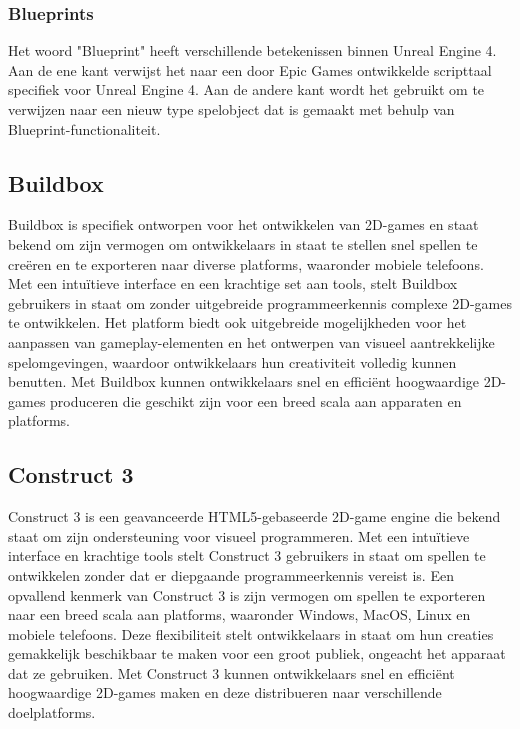 \subsubsection{Blueprints}
Het woord "Blueprint" heeft verschillende betekenissen binnen Unreal Engine 4. Aan de ene kant verwijst het naar een door Epic Games ontwikkelde scripttaal specifiek voor Unreal Engine 4. Aan de andere kant wordt het gebruikt om te verwijzen naar een nieuw type spelobject dat is gemaakt met behulp van Blueprint-functionaliteit.
\autocite{romero2019blueprints}

\subsection{Buildbox}
Buildbox is specifiek ontworpen voor het ontwikkelen van 2D-games en staat bekend om zijn vermogen om ontwikkelaars in staat te stellen snel spellen te creëren en te exporteren naar diverse platforms, waaronder mobiele telefoons. Met een intuïtieve interface en een krachtige set aan tools, stelt Buildbox gebruikers in staat om zonder uitgebreide programmeerkennis complexe 2D-games te ontwikkelen. Het platform biedt ook uitgebreide mogelijkheden voor het aanpassen van gameplay-elementen en het ontwerpen van visueel aantrekkelijke spelomgevingen, waardoor ontwikkelaars hun creativiteit volledig kunnen benutten. Met Buildbox kunnen ontwikkelaars snel en efficiënt hoogwaardige 2D-games produceren die geschikt zijn voor een breed scala aan apparaten en platforms. \autocite{audronis2016buildbox}

\subsection{Construct 3}
Construct 3 is een geavanceerde HTML5-gebaseerde 2D-game engine die bekend staat om zijn ondersteuning voor visueel programmeren. Met een intuïtieve interface en krachtige tools stelt Construct 3 gebruikers in staat om spellen te ontwikkelen zonder dat er diepgaande programmeerkennis vereist is. Een opvallend kenmerk van Construct 3 is zijn vermogen om spellen te exporteren naar een breed scala aan platforms, waaronder Windows, MacOS, Linux en mobiele telefoons. Deze flexibiliteit stelt ontwikkelaars in staat om hun creaties gemakkelijk beschikbaar te maken voor een groot publiek, ongeacht het apparaat dat ze gebruiken. Met Construct 3 kunnen ontwikkelaars snel en efficiënt hoogwaardige 2D-games maken en deze distribueren naar verschillende doelplatforms. \autocite{enwiki:1200994136}

